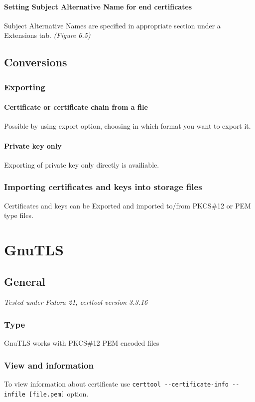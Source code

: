 \documentclass[10pt, a4paper]{report}
\begin{document}
    \subsubsection{Setting Subject Alternative Name for end certificates}
Subject Alternative Names are specified in appropriate section under a Extensions tab.
\textit{(Figure 6.5)}

\section{Conversions}

  \subsection{Exporting}
  
    \subsubsection{Certificate or certificate chain from a file}
Possible by using export option, choosing in which format you want to export it.

    \subsubsection{Private key only}
Exporting of private key only directly is availiable.

  \subsection{Importing certificates and keys into storage files}
Certificates and keys can be Exported and imported to/from PKCS\#12 or PEM type files.

\chapter{GnuTLS}

\section{General}

\textit{Tested under Fedora 21, certtool version 3.3.16}

  \subsection{Type}
GnuTLS works with PKCS\#12 PEM encoded files
  \subsection{View and information}
To view information about certificate use \verb+certtool --certificate-info --infile [file.pem]+ option.
\end{document}
